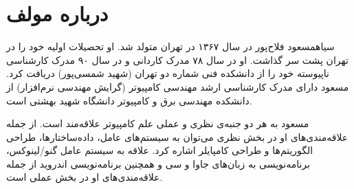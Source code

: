 \section*{درباره مولف}
‌سیاه{مسعود فلاح‌پور} در سال ۱۳۶۷ در تهران متولد شد. او تحصیلات اولیه خود را در تهران پشت سر گذاشت. او در سال ۷۸ مدرک کاردانی و در سال ۹۰ مدرک کارشناسی ناپیوسته خود را از دانشکده فنی شماره دو تهران (شهید شمسی‌پور) دریافت کرد. مسعود دارای مدرک کارشناسی ارشد مهندسی کامپیوتر (گرایش مهندسی نرم‌افزار) از دانشکده مهندسی برق و کامپیوتر دانشگاه شهید بهشتی است.

مسعود به هر دو جنبه‌ی نظری و عملی علم کامپیوتر علاقه‌مند است. از جمله علاقه‌مندی‌های او در بخش نظری می‌توان به سیستم‌های عامل، داده‌ساختارها، طراحی الگوریتم‌ها و طراحی کامپایلر اشاره کرد. علاقه به سیستم‌ عامل گنو/لینوکس، برنامه‌نویسی به زبان‌های جاوا و سی و همچنین برنامه‌نویسی اندروید از جمله علاقه‌مندی‌های او در بخش عملی است.
\newpage